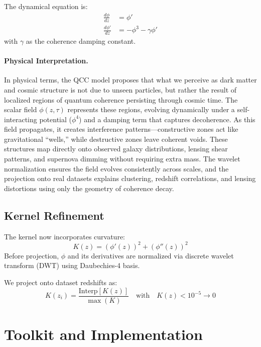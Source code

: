 \documentclass[12pt]{article}
\begin{document}
The dynamical equation is:
\begin{align}
\frac{d\phi}{dz} &= \phi' \\
\frac{d\phi'}{dz} &= -\phi^3 - \gamma \phi'
\end{align}
with $\gamma$ as the coherence damping constant.

\paragraph{Physical Interpretation.}
In physical terms, the QCC model proposes that what we perceive as dark matter and cosmic structure is not due to unseen particles, but rather the result of localized regions of quantum coherence persisting through cosmic time. The scalar field $\phi(z, \tau)$ represents these regions, evolving dynamically under a self-interacting potential ($\phi^4$) and a damping term that captures decoherence. As this field propagates, it creates interference patterns—constructive zones act like gravitational ``wells,'' while destructive zones leave coherent voids. These structures map directly onto observed galaxy distributions, lensing shear patterns, and supernova dimming without requiring extra mass. The wavelet normalization ensures the field evolves consistently across scales, and the projection onto real datasets explains clustering, redshift correlations, and lensing distortions using only the geometry of coherence decay.


\subsection{Kernel Refinement}
The kernel now incorporates curvature:
\begin{equation}
K(z) = \left( \phi'(z) \right)^2 + \left( \phi''(z) \right)^2
\end{equation}
Before projection, $\phi$ and its derivatives are normalized via discrete wavelet transform (DWT) using Daubechies-4 basis.

We project onto dataset redshifts as:
\begin{equation}
K(z_i) = \frac{\text{Interp}[K(z)]}{\max(K)} \quad \text{with} \quad K(z) < 10^{-5} \rightarrow 0
\end{equation}

\section{Toolkit and Implementation}
\end{document}
